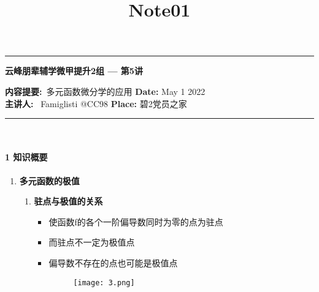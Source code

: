 \documentclass[12pt]{scrartcl}
\title{Note01}
\begin{document}
\begin{center}
	\hrule
	\vspace{.4cm}
	{\textbf { \large 云峰朋辈辅学微甲提升2组 --- 第5讲}}
\end{center}
{\textbf{内容提要:}\ 多元函数微分学的应用 \hspace{\fill} \textbf{Date:} May 1 2022    \\
{ \textbf{主讲人:}} \ Famiglisti @CC98  \hspace{\fill} \textbf{Place:} 碧2党员之家 \\
	\hrule
~\\


\paragraph*{\large 1 知识概要}
\begin{enumerate}
    \item  \textbf{多元函数的极值}
    \begin{enumerate}
        \item \textbf{驻点与极值的关系}
    
        \begin{itemize}
        \item 使函数f的各个一阶偏导数同时为零的点为驻点
        \item 而驻点不一定为极值点
        \item 偏导数不存在的点也可能是极值点
        \begin{figure}[H]
            \centering
            \texttt{[image: 3.png]}
            \end{figure}
        \end{itemize}


\end{enumerate}
\end{enumerate}}
\end{document}

